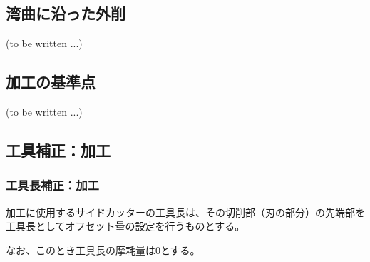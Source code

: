 \subsection{湾曲に沿った外削\TBW}
(to be written ...)


\clearpage


\subsection{\Keyway 加工の基準点\TBW}
(to be written ...)


\subsection{工具補正：\Keyway 加工}


\subsubsection{工具長補正：\Keyway 加工}
\Keyway 加工に使用するサイドカッターの工具長は、その切削部（刃の部分）の先端部を工具長としてオフセット量の設定を行うものとする。

なお、このとき工具長の摩耗量は0とする。


